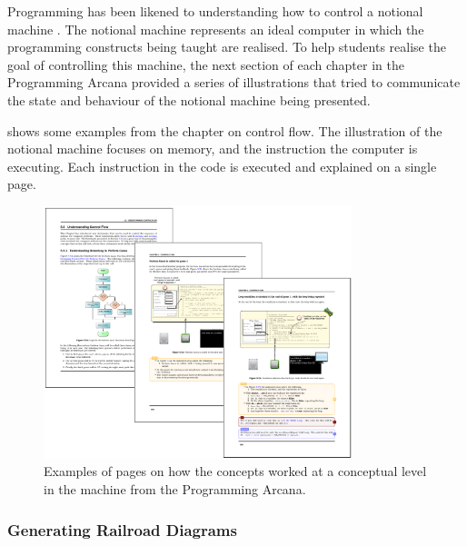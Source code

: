 
Programming has been likened to understanding how to control a notional machine \cite{DuBoulay:1986}. The notional machine represents an ideal computer in which the programming constructs being taught are realised. To help students realise the goal of controlling this machine, the next section of each chapter in the Programming Arcana provided a series of illustrations that tried to communicate the state and behaviour of the notional machine being presented. 

 shows some examples from the chapter on control flow. The illustration of the notional machine focuses on memory, and the instruction the computer is executing. Each instruction in the code is executed and explained on a single page.

\begin{figure}[h]
  \centering
  \includegraphics[width=0.8\textwidth]{ArcanaUnderstand}
  \caption{Examples of pages on how the concepts worked at a conceptual level in the machine from the Programming Arcana.}
  \label{fig:arcana_understanding}
\end{figure}

\clearpage





\subsubsection{Generating Railroad Diagrams} %
\label{ssub:railroad_diagrams}

